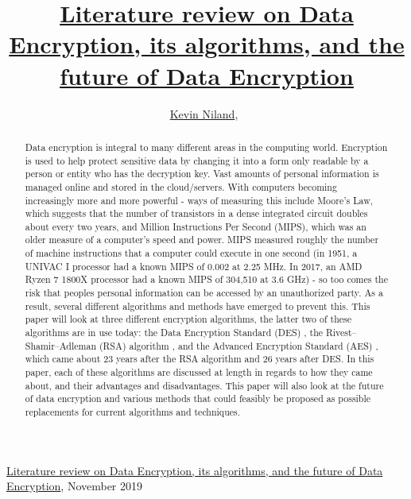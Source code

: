 \documentclass[journal]{IEEEtran}
\begin{document}
{\href{https://github.com/kevinniland97/Literature-review-on-Data-Encryption-algorithm}{Literature review on Data Encryption, its algorithms, and the future of Data Encryption}, November 2019}

\title{\href{https://github.com/kevinniland97/Literature-review-on-Data-Encryption-algorithms}{Literature review on Data Encryption, its algorithms, and the future of Data Encryption}}
\author{\href{https://github.com/kevinniland97}{Kevin Niland},~}
\maketitle

\begin{abstract}
Data encryption is integral to many different areas in the computing world. Encryption is used to help protect sensitive data by changing it into a form only readable by a person or entity who has the decryption key. Vast amounts of personal information is managed online and stored in the cloud/servers. With computers becoming increasingly more and more powerful - ways of measuring this include Moore's Law, which suggests that the number of transistors in a dense integrated circuit doubles about every two years, and Million Instructions Per Second (MIPS), which was an older measure of a computer's speed and power. MIPS measured roughly the number of machine instructions that a computer could execute in one second (in 1951, a UNIVAC I processor had a known MIPS of 0.002 at 2.25 MHz. In 2017, an AMD Ryzen 7 1800X processor had a known MIPS of 304,510 at 3.6 GHz) - so too comes the risk that peoples personal information can be accessed by an unauthorized party. As a result, several different algorithms and methods have emerged to prevent this. This paper will look at three different encryption algorithms, the latter two of these algorithms are in use today: the Data Encryption Standard (DES) \cite{des}, the Rivest–Shamir–Adleman (RSA) algorithm \cite{rsa}, and the Advanced Encryption Standard (AES) \cite{aes}, which came about 23 years after the RSA algorithm and 26 years after DES. In this paper, each of these algorithms are discussed at length in regards to how they came about, and their advantages and disadvantages. This paper will also look at the future of data encryption and various methods that could feasibly be proposed as possible replacements for current algorithms and techniques. 
\end{abstract}
\end{document}
